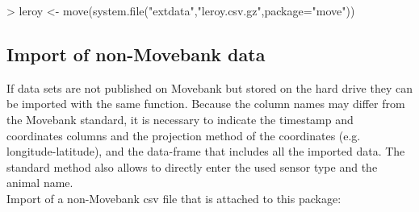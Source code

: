 \documentclass[article,nojss]{jss}
\newcommand{\fct}[1]{{\code{#1()}}}
\begin{document}
\begin{Schunk}
\begin{Sinput}
> leroy <- move(system.file("extdata","leroy.csv.gz",package="move"))
\end{Sinput}
\end{Schunk}

\subsection{Import of non-Movebank data}
If data sets are not published on Movebank but stored on the hard drive they can be imported with the same \fct{move} function. Because the column names may differ from the Movebank standard, it is necessary to indicate the timestamp and coordinates columns and the projection method of the coordinates (e.g. longitude-latitude), and the data-frame that includes all the imported data. The standard \fct{move} method also allows to directly enter the used sensor type and the animal name. \\
Import of a non-Movebank csv file that is attached to this package:
\end{document}
